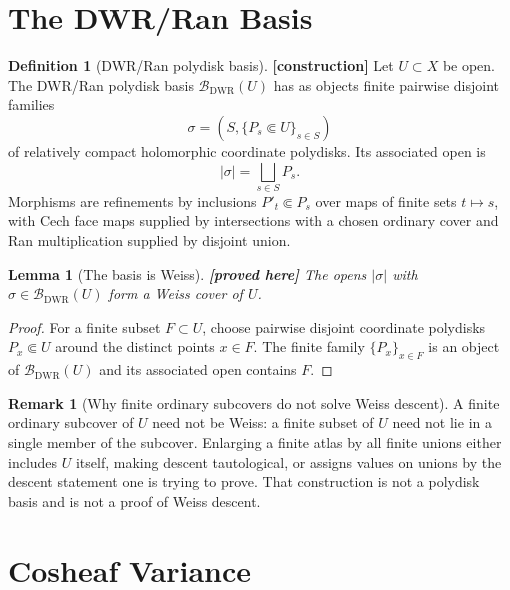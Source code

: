 \documentclass[11pt]{article}
\newtheorem{lemma}[theorem]{Lemma}
\theoremstyle{definition}
\newtheorem{definition}[theorem]{Definition}
\newtheorem{remark}[theorem]{Remark}
\providecommand{\ClaimStatusProvedHere}[1][]{\textbf{[proved here#1]}}
\providecommand{\ClaimStatusConstruction}{\textbf{[construction]}}
\providecommand{\cB}{\mathcal{B}}
\begin{document}
\section{The DWR/Ran Basis}
\label{sec:dwr-ran-basis}

\begin{definition}[DWR/Ran polydisk basis]
\label{def:dwr-ran-basis}
\ClaimStatusConstruction{}
Let $U\subset X$ be open. The DWR/Ran polydisk basis
$\cB_{\mathrm{DWR}}(U)$ has as objects finite pairwise disjoint
families
\[
 \sigma=(S,\{P_s\Subset U\}_{s\in S})
\]
of relatively compact holomorphic coordinate polydisks. Its associated
open is
\[
 |\sigma|=\bigsqcup_{s\in S}P_s.
\]
Morphisms are refinements by inclusions $P'_t\Subset P_s$ over maps of
finite sets $t\mapsto s$, with Cech face maps supplied by intersections
with a chosen ordinary cover and Ran multiplication supplied by
disjoint union.
\end{definition}

\begin{lemma}[The basis is Weiss]
\label{lem:dwr-basis-weiss}
\ClaimStatusProvedHere{}
The opens $|\sigma|$ with $\sigma\in\cB_{\mathrm{DWR}}(U)$ form a Weiss
cover of $U$.
\end{lemma}

\begin{proof}
For a finite subset $F\subset U$, choose pairwise disjoint coordinate
polydisks $P_x\Subset U$ around the distinct points $x\in F$. The
finite family $\{P_x\}_{x\in F}$ is an object of
$\cB_{\mathrm{DWR}}(U)$ and its associated open contains $F$.
\end{proof}

\begin{remark}[Why finite ordinary subcovers do not solve Weiss descent]
\label{rem:finite-subcovers-not-weiss}
A finite ordinary subcover of $U$ need not be Weiss: a finite subset of
$U$ need not lie in a single member of the subcover. Enlarging a finite
atlas by all finite unions either includes $U$ itself, making descent
tautological, or assigns values on unions by the descent statement one
is trying to prove. That construction is not a polydisk basis and is
not a proof of Weiss descent.
\end{remark}

\section{Cosheaf Variance}
\label{sec:cosheaf-variance}
\end{document}
